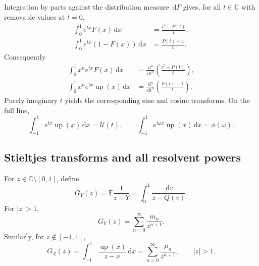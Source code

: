 \documentclass[11pt,oneside]{article}
\theoremstyle{definition}
\newcommand{\F}{F}
\newcommand{\Q}{Q}
\newcommand{\upf}{\operatorname{up}}
\newcommand{\E}{\mathbb E}
\newcommand{\C}{\mathbb C}
\newcommand{\dd}{\,\mathrm d}
\begin{document}
Integration by parts against the distribution measure \(\dd\F\) gives, for all
\(t\in\C\) with removable values at \(t=0\),
\begin{align}
 \int_0^1e^{tx}\F(x)\dd x
 &=\frac{e^t-P(t)}t,
 \label{eq:Laplace-F}\\
 \int_0^1e^{tx}(1-\F(x))\dd x
 &=\frac{P(t)-1}t.
 \label{eq:Laplace-up-half}
\end{align}
Consequently
\begin{align}
 \int_0^1x^ne^{tx}\F(x)\dd x
 &=\frac{\dd^n}{\dd t^n}\left(\frac{e^t-P(t)}t\right),
 \label{eq:exp-poly-F}\\
 \int_0^1x^ne^{tx}\upf(x)\dd x
 &=\frac{\dd^n}{\dd t^n}\left(\frac{P(t)-1}t\right).
 \label{eq:exp-poly-up}
\end{align}
Purely imaginary \(t\) yields the corresponding sine and cosine transforms.  On the
full line,
\begin{equation}\label{eq:bilateral-up-transform}
 \int_{-1}^1e^{tx}\upf(x)\dd x=\mathcal U(t),
 \qquad
 \int_{-1}^1e^{i\omega x}\upf(x)\dd x=\phi(\omega).
\end{equation}

\subsection{Stieltjes transforms and all resolvent powers}

For \(z\in\C\setminus[0,1]\), define
\begin{equation}\label{eq:GY-def}
 G_Y(z)=\E\frac1{z-Y}
 =\int_0^1\frac{\dd v}{z-\Q(v)}.
\end{equation}
For \(|z|>1\),
\begin{equation}\label{eq:GY-moment-series}
 G_Y(z)=\sum_{n=0}^{\infty}\frac{m_n}{z^{n+1}}.
\end{equation}
Similarly, for \(z\notin[-1,1]\),
\begin{equation}\label{eq:GZ-def}
 G_Z(z)=\int_{-1}^1\frac{\upf(x)}{z-x}\dd x
 =\sum_{n=0}^{\infty}\frac{\mu_n}{z^{n+1}},
 \qquad |z|>1.
\end{equation}
\end{document}
